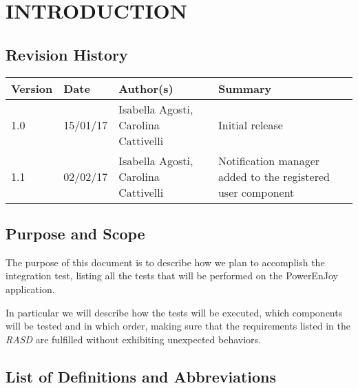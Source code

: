 \section{INTRODUCTION}
\subsection{Revision History}
 \begin{table}[h]
 	\centering
 	\begin{tabular}{| m{1.5cm} | m{1.6cm} | m{5cm} | m{3.9cm} |}
 		\hline
 		\textbf{Version} & \textbf{Date} & \textbf{Author(s)} & \textbf{Summary}\\
 		\hline
 		1.0 & 15/01/17 & Isabella Agosti, Carolina Cattivelli & Initial release\\
 		\hline
 		1.1 & 02/02/17 & Isabella Agosti, Carolina Cattivelli & Notification manager added to the registered user component\\
 		\hline
 	\end{tabular}
 \end{table}

\subsection{Purpose and Scope}
The purpose of this document is to describe how we plan to accomplish the integration test, listing all the tests that will be performed on the PowerEnJoy application.

In particular we will describe how the tests will be executed, which components will be tested and in which order, making sure that the requirements listed in the \textit{RASD} are fulfilled without exhibiting unexpected behaviors.  
\newpage
\subsection{List of Definitions and Abbreviations}
